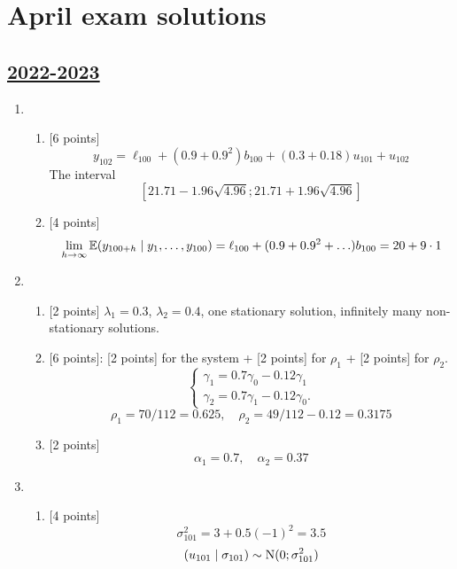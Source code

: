 
\newpage
\thispagestyle{empty}
\section{April exam solutions}
 

\subsection[2022-2023]{\hyperref[sec:kr_03_2022_2023]{2022-2023}}
\label{sec:sol_kr_03_2022_2023} %

\begin{enumerate}
    \item 
\begin{enumerate}
    \item {[6 points]}
    \[
        y_{102}= \ell_{100} + (0.9 + 0.9^2) b_{100} + (0.3 + 0.18)u_{101} + u_{102}    
        \]
        The interval
        \[
        [21.71 - 1.96 \sqrt{4.96};21.71 + 1.96 \sqrt{4.96}]    
        \]
    \item {[4 points]}
    \[
    \lim_{h\to\infty} \operatorname{\mathbb{E}}(y_{100+h} \mid y_1, \ldots, y_{100}) = \ell_{100} + (0.9 + 0.9^2 +\ldots) b_{100} = 20 + 9\cdot 1    
    \]    
\end{enumerate}
\item 
\begin{enumerate}
    \item {[2 points]} $\lambda_1 = 0.3$, $\lambda_2 = 0.4$, one stationary solution, infinitely many non-stationary solutions. 
    \item {[6 points]}: {[2 points] for the system} + {[2 points] for $\rho_1$} + {[2 points] for $\rho_2$}.
    \[
        \begin{cases}
            \gamma_1 = 0.7 \gamma_0  - 0.12 \gamma_1 \\
            \gamma_2 = 0.7 \gamma_1 - 0.12 \gamma_0. 
        \end{cases}
    \]
    \[
    \rho_1 = 70/112 = 0.625, \quad \rho_2 = 49/112 - 0.12 = 0.3175    
    \]
    \item {[2 points]}
    \[
    \alpha_1 = 0.7, \quad \alpha_2 = 0.37    
    \]
\end{enumerate}
\item 
\begin{enumerate}
    \item {[4 points]}
    \[
    \sigma^2_{101} = 3 + 0.5 (-1)^2= 3.5    
    \]
    \[
    (u_{101}\mid \sigma_{101}) \sim \mathrm{N}(0; \sigma^2_{101})    
\]
\end{enumerate}
\end{enumerate}
